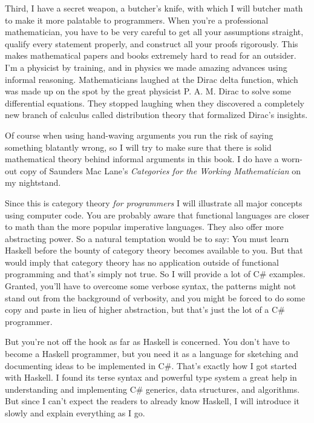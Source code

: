 Third, I have a secret weapon, a butcher's knife, with which I will
butcher math to make it more palatable to programmers. When you're a
professional mathematician, you have to be very careful to get all your
assumptions straight, qualify every statement properly, and construct
all your proofs rigorously. This makes mathematical papers and books
extremely hard to read for an outsider. I'm a physicist by training, and
in physics we made amazing advances using informal reasoning.
Mathematicians laughed at the Dirac delta function, which was made up on
the spot by the great physicist P. A. M. Dirac to solve some
differential equations. They stopped laughing when they discovered a
completely new branch of calculus called distribution theory that
formalized Dirac's insights.

Of course when using hand-waving arguments you run the risk of saying
something blatantly wrong, so I will try to make sure that there is
solid mathematical theory behind informal arguments in this book. I do
have a worn-out copy of Saunders Mac Lane's \emph{Categories for
  the Working Mathematician} on my nightstand.

Since this is category theory \emph{for programmers} I will illustrate
all major concepts using computer code. You are probably aware that
functional languages are closer to math than the more popular imperative
languages. They also offer more abstracting power. So a natural
temptation would be to say: You must learn Haskell before the bounty of
category theory becomes available to you. But that would imply that
category theory has no application outside of functional programming and
that's simply not true. So I will provide a lot of C\# examples.
Granted, you'll have to overcome some verbose syntax, the patterns might
not stand out from the background of verbosity, and you might be forced
to do some copy and paste in lieu of higher abstraction, but that's just
the lot of a C\# programmer.

But you're not off the hook as far as Haskell is concerned. You don't
have to become a Haskell programmer, but you need it as a language for
sketching and documenting ideas to be implemented in C\#. That's exactly
how I got started with Haskell. I found its terse syntax and powerful
type system a great help in understanding and implementing C\#
generics, data structures, and algorithms. But since I can't expect the
readers to already know Haskell, I will introduce it slowly and explain
everything as I go.

